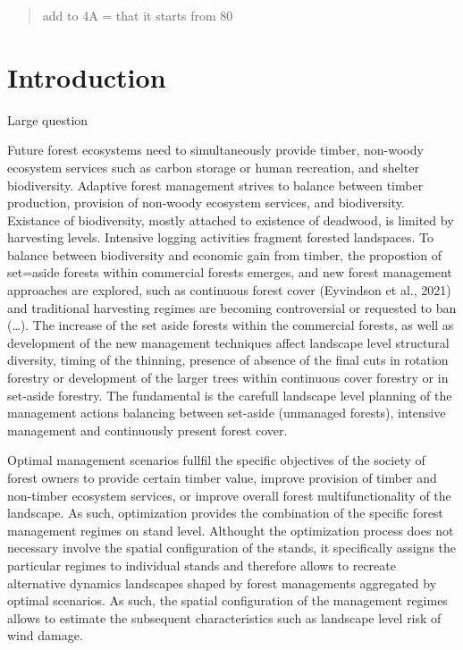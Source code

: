 \documentclass[]{elsarticle} %
\begin{document}
\begin{frontmatter}
\begin{abstract}
  add to 4A = that it starts from 80
  \end{abstract}
  
 \end{frontmatter}

\newpage

\section{Introduction}\label{introduction}

Large question

Future forest ecosystems need to simultaneously provide timber,
non-woody ecosystem services such as carbon storage or human recreation,
and shelter biodiversity. Adaptive forest management strives to balance
between timber production, provision of non-woody ecosystem services,
and biodiversity. Existance of biodiversity, mostly attached to
existence of deadwood, is limited by harvesting levels. Intensive
logging activities fragment forested landspaces. To balance between
biodiversity and economic gain from timber, the propostion of set=aside
forests within commercial forests emerges, and new forest management
approaches are explored, such as continuous forest cover (Eyvindson et
al., 2021) and traditional harvesting regimes are becoming controversial
or requested to ban (\ldots{}). The increase of the set aside forests
within the commercial forests, as well as development of the new
management techniques affect landscape level structural diversity,
timing of the thinning, presence of absence of the final cuts in
rotation forestry or development of the larger trees within continuous
cover forestry or in set-aside forestry. The fundamental is the carefull
landscape level planning of the management actions balancing between
set-aside (unmanaged forests), intensive management and continuously
present forest cover.

Optimal management scenarios fullfil the specific objectives of the
society of forest owners to provide certain timber value, improve
provision of timber and non-timber ecosystem services, or improve
overall forest multifunctionality of the landscape. As such,
optimization provides the combination of the specific forest management
regimes on stand level. Althought the optimization process does not
necessary involve the spatial configuration of the stands, it
specifically assigns the particular regimes to individual stands and
therefore allows to recreate alternative dynamics landscapes shaped by
forest managements aggregated by optimal scenarios. As such, the spatial
configuration of the management regimes allows to estimate the
subsequent characteristics such as landscape level risk of wind damage.
\end{document}

